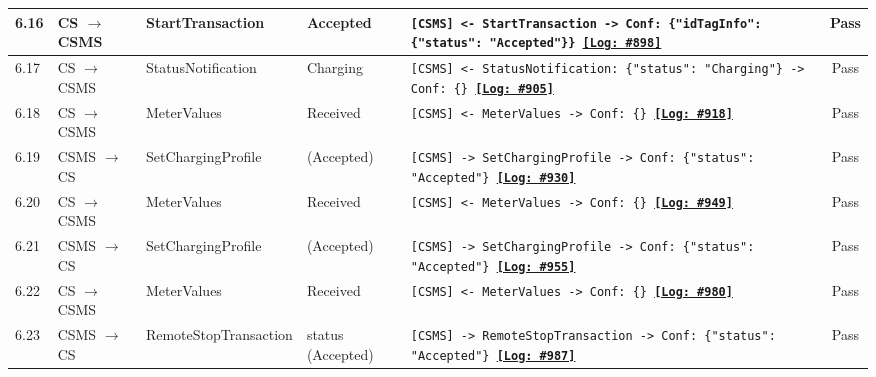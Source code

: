 \documentclass[10pt, a4paper, landscape]{article}
\begin{document}
\begin{longtable}{|p{1.0cm}|p{2.5cm}|p{4.0cm}|p{5.0cm}|p{10.0cm}|c|}
\hline
6.16 & CS $\to$ CSMS & StartTransaction & Accepted & \footnotesize\texttt{[CSMS] <- StartTransaction \newline [CSMS] -> Conf: \{"idTagInfo": \{"status": "Accepted"\}\} \newline \hyperref[log:6.16]{\textbf{[Log: \#898]}}} & Pass \\
\hline
6.17 & CS $\to$ CSMS & StatusNotification & Charging & \footnotesize\texttt{[CSMS] <- StatusNotification: \{"status": "Charging"\} \newline [CSMS] -> Conf: \{\} \newline \hyperref[log:6.17]{\textbf{[Log: \#905]}}} & Pass \\
\hline
6.18 & CS $\to$ CSMS & MeterValues & Received & \footnotesize\texttt{[CSMS] <- MeterValues \newline [CSMS] -> Conf: \{\} \newline \hyperref[log:6.18]{\textbf{[Log: \#918]}}} & Pass \\
\hline
6.19 & CSMS $\to$ CS & SetChargingProfile & (Accepted) & \footnotesize\texttt{[CSMS] -> SetChargingProfile \newline [CS] -> Conf: \{"status": "Accepted"\} \newline \hyperref[log:6.19]{\textbf{[Log: \#930]}}} & Pass \\
\hline
6.20 & CS $\to$ CSMS & MeterValues & Received & \footnotesize\texttt{[CSMS] <- MeterValues \newline [CSMS] -> Conf: \{\} \newline \hyperref[log:6.20]{\textbf{[Log: \#949]}}} & Pass \\
\hline
6.21 & CSMS $\to$ CS & SetChargingProfile & (Accepted) & \footnotesize\texttt{[CSMS] -> SetChargingProfile \newline [CS] -> Conf: \{"status": "Accepted"\} \newline \hyperref[log:6.21]{\textbf{[Log: \#955]}}} & Pass \\
\hline
6.22 & CS $\to$ CSMS & MeterValues & Received & \footnotesize\texttt{[CSMS] <- MeterValues \newline [CSMS] -> Conf: \{\} \newline \hyperref[log:6.22]{\textbf{[Log: \#980]}}} & Pass \\
\hline
6.23 & CSMS $\to$ CS & RemoteStopTransaction & status (Accepted) & \footnotesize\texttt{[CSMS] -> RemoteStopTransaction \newline [CS] -> Conf: \{"status": "Accepted"\} \newline \hyperref[log:6.23]{\textbf{[Log: \#987]}}} & Pass \\

\end{longtable}
\end{document}
